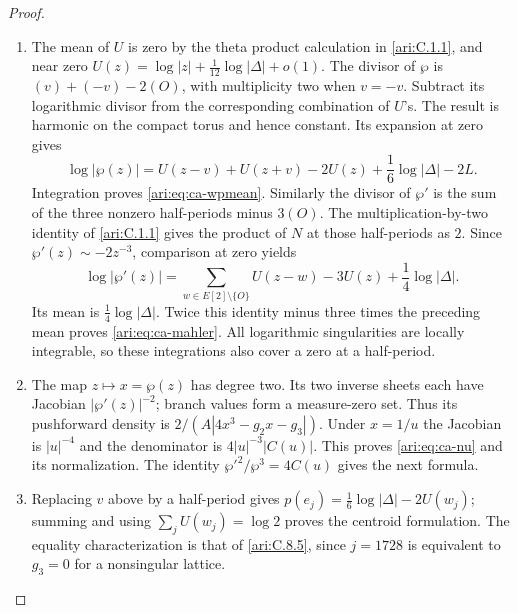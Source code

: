 \begin{proof}
\begin{enumerate}[label=\arabic*.,leftmargin=*]
\item The mean of $U$ is zero by the theta product calculation in \cref{ari:C.1.1},
and near zero
$U(z)=\log|z|+\frac1{12}\log|\Delta|+o(1)$.
The divisor of $\wp$ is $(v)+(-v)-2(O)$, with multiplicity
two when $v=-v$. Subtract its logarithmic divisor from the
corresponding combination of $U$'s. The result is harmonic
on the compact torus and hence constant. Its expansion at
zero gives
\[
 \log|\wp(z)|=U(z-v)+U(z+v)-2U(z)
                  +\frac16\log|\Delta|-2L.
\]
Integration proves \eqref{ari:eq:ca-wpmean}.
Similarly the divisor of $\wp'$ is the sum of the three
nonzero half-periods minus $3(O)$. The multiplication-by-two
identity of \cref{ari:C.1.1} gives the product of $N$ at those half-periods
as $2$. Since $\wp'(z)\sim-2z^{-3}$, comparison at zero yields
\[
 \log|\wp'(z)|=\sum_{w\in E[2]\setminus\{O\}}U(z-w)-3U(z)
                         +\frac14\log|\Delta|.
\]
Its mean is $\frac14\log|\Delta|$. Twice this identity minus
three times the preceding mean proves \eqref{ari:eq:ca-mahler}.
All logarithmic singularities are locally integrable, so these
integrations also cover a zero at a half-period.

\item The map $z\mapsto x=\wp(z)$ has degree two. Its two inverse
sheets each have Jacobian $|\wp'(z)|^{-2}$; branch values form
a measure-zero set. Thus its pushforward density is
$2/(A|4x^3-g_2x-g_3|)$. Under $x=1/u$ the Jacobian is
$|u|^{-4}$ and the denominator is $4|u|^{-3}|C(u)|$.
This proves \eqref{ari:eq:ca-nu} and its normalization. The identity
$\wp'^2/\wp^3=4C(u)$ gives the next formula.

\item Replacing $v$ above by a half-period gives
$p(e_j)=\frac16\log|\Delta|-2U(w_j)$; summing and using
$\sum_jU(w_j)=\log2$ proves the centroid formulation.
The equality characterization is that of \ref{ari:C.8.5},
since $j=1728$ is equivalent to $g_3=0$ for a nonsingular lattice.
\end{enumerate}
\end{proof}